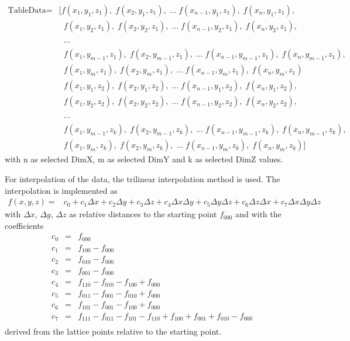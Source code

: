 \begin{align*}
\textrm{TableData} =& [f(x_1, y_1, z_1),\; f(x_2, y_1, z_1),\; ...\; f(x_{n-1}, y_1, z_1),\; f(x_{n},y_1, z_1),\\
                                 &  \phantom{[}\;f(x_1, y_2, z_1),\; f(x_2, y_2, z_1),\; ...\; f(x_{n-1}, y_2, z_1),\; f(x_{n},y_2, z_1),\\
								 &  \phantom{[}\;...\\
                                 &  \phantom{[}\;f(x_1, y_{m-1}, z_1),\; f(x_2, y_{m-1}, z_1),\; ... \;f(x_{n-1}, y_{m-1}, z_1),\; f(x_{n},y_{m-1}, z_1),\\
                                 &  \phantom{[}\;f(x_1, y_{m}, z_1),\; f(x_2, y_{m}, z_1),\; ...\; f(x_{n-1}, y_{m}, z_1),\; f(x_{n},y_{m}, z_1)\\
								 &  \phantom{[}\;f(x_1, y_1, z_2),\; f(x_2, y_1, z_2),\; ...\; f(x_{n-1}, y_1, z_2),\; f(x_{n},y_1, z_2),\\
								 &  \phantom{[}\;f(x_1, y_2, z_2),\; f(x_2, y_2, z_2),\; ...\; f(x_{n-1}, y_2, z_2),\; f(x_{n},y_2, z_2),\\
                                 &  \phantom{[}\;...\\
                                 &  \phantom{[}\;f(x_1, y_{m-1}, z_{k}),\; f(x_2, y_{m-1}, z_{k}),\; ... \;f(x_{n-1}, y_{m-1}, z_{k}),\; f(x_{n},y_{m-1}, z_{k}),\\
                                 &  \phantom{[}\;f(x_1, y_{m}, z_{k}),\; f(x_2, y_{m}, z_{k}),\; ...\; f(x_{n-1}, y_{m}, z_{k}),\; f(x_{n},y_{m}, z_{k})]
\end{align*}
with n as selected DimX, m as selected DimY and k as selected DimZ values.

For interpolation of the data, the trilinear interpolation method is used. The interpolation is implemented as
\begin{eqnarray*}
f(x,y,z) =& c_0 + c_1\Delta x + c_2\Delta y + c_3\Delta z + c_4\Delta x\Delta y + c_5\Delta y\Delta z + c_6\Delta z\Delta x + c_7\Delta x\Delta y\Delta z
\end{eqnarray*}
with $\Delta x$, $\Delta y$, $\Delta z$ as relative distances to the starting point $f_{000}$ and with the coefficients 
\begin{eqnarray*}
c_0 &=& f_{000}\\
c_1 &=& f_{100} - f_{000}\\
c_2 &=& f_{010} - f_{000}\\
c_3 &=& f_{001} - f_{000}\\
c_4 &=& f_{110} - f_{010} - f_{100} + f_{000}\\
c_5 &=& f_{011} - f_{001} - f_{010} + f_{000}\\
c_6 &=& f_{101} - f_{001} - f_{100} + f_{000}\\
c_7 &=& f_{111} - f_{011} - f_{101} - f_{110} + f_{100} + f_{001} + f_{010} - f_{000}\\
\end{eqnarray*}
derived from the lattice points relative to the starting point. 